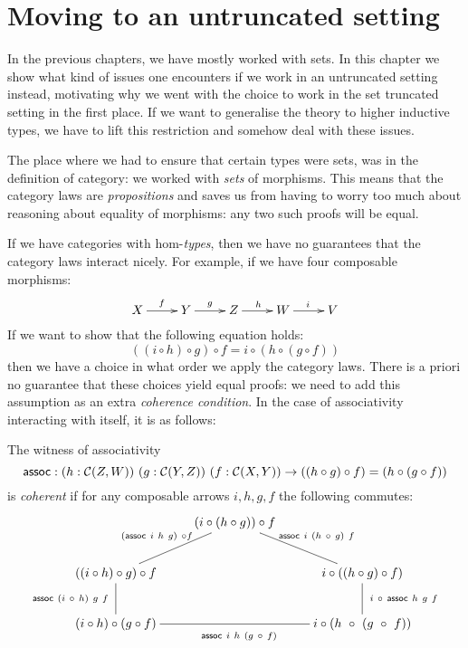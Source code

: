 \chapter{Moving to an untruncated setting}
\label{untruncated}

In the previous chapters, we have mostly worked with sets. In this
chapter we show what kind of issues one encounters if we work in an
untruncated setting instead, motivating why we went with the choice to
work in the set truncated setting in the first place. If we want to
generalise the theory to higher inductive types, we have to lift this
restriction and somehow deal with these issues.

The place where we had to ensure that certain types were sets, was in
the definition of category: we worked with \emph{sets} of
morphisms. This means that the category laws are \emph{propositions}
and saves us from having to worry too much about reasoning about
equality of morphisms: any two such proofs will be equal.

If we have categories with hom-\emph{types}, then we have no
guarantees that the category laws interact nicely. For example, if we
have four composable morphisms:
$$
\xymatrix{
  X \ar[r]^{f} &Y \ar[r]^{g} &Z \ar[r]^{h} &W \ar[r]^{i} &V
}
$$
If we want to show that the following equation holds:
$$
((i \circ h) \circ g) \circ f = i \circ (h \circ (g \circ f))
$$
then we have a choice in what order we apply the category laws. There
is a priori no guarantee that these choices yield equal proofs: we
need to add this assumption as an extra \emph{coherence condition}. In
the case of associativity interacting with itself, it is as follows:

\begin{definition}
  The witness of associativity
  $$
  \assoc : (h : \Cc(Z,W))\ (g : \Cc(Y,Z))\ (f : \Cc(X,Y)) \to ((h \circ g) \circ f) = (h \circ (g \circ f))
  $$
  is \emph{coherent} if for any composable arrows $i, h, g, f$ the
  following commutes:
  $$
  \xymatrix{
    &(i \circ (h \circ g)) \circ f \ar@{-}[dr]^*+{\labelstyle \assoc\ i\ (h\ \circ\ g)\ f} &\\
    ((i \circ h) \circ g) \circ f \ar@{-}[ur]^*+{\labelstyle (\assoc\ i\ h\ g)\ \circ f} \ar@{-}[d]_*+{\labelstyle \assoc\ (i\ \circ\ h)\ g\ f}  &&i \circ ((h \circ g) \circ f) \ar@{-}[d]^*+{\labelstyle i\ \circ\ \assoc\ h\ g\ f}\\
    (i \circ h) \circ (g \circ f) \ar@{-}[rr]_*+{\labelstyle \assoc\ i\ h\ (g\ \circ\ f)} &&i \circ (h\ \circ\ (g\ \circ\ f))
  }
  $$
\end{definition}

